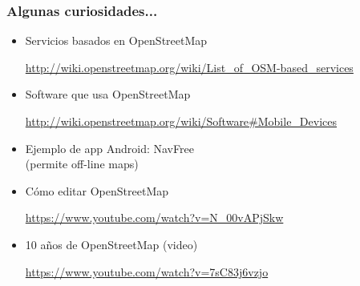 \begin{frame}
\frametitle{Algunas curiosidades...}

\begin{itemize}
\item Servicios basados en OpenStreetMap \\
  \begin{footnotesize}
  \url{http://wiki.openstreetmap.org/wiki/List_of_OSM-based_services} 
  \end{footnotesize}
\item Software que usa OpenStreetMap \\
  \begin{footnotesize}
  \url{http://wiki.openstreetmap.org/wiki/Software\#Mobile_Devices} 
  \end{footnotesize}
\item Ejemplo de app Android: NavFree \\
  (permite off-line maps) 
\item Cómo editar OpenStreetMap \\
  \begin{footnotesize}
  \url{https://www.youtube.com/watch?v=N_00vAPjSkw} 
  \end{footnotesize}
\item 10 años de OpenStreetMap (video) \\
  \begin{footnotesize}
  \url{https://www.youtube.com/watch?v=7sC83j6vzjo} 
  \end{footnotesize}
\end{itemize}

\end{frame}

